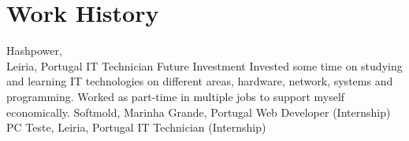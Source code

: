 \section[\faGears]{Work History}
    {Hashpower,\\Leiria, Portugal}
    {IT Technician}
    {}
    {}
    {Future Investment}
    {Invested some time on studying and learning IT technologies on different areas, hardware, network, systems and programming. Worked as part-time in multiple jobs to support myself economically.}
    {Softmold, Marinha Grande, Portugal}
    {Web Developer (Internship)}
    {}
    {PC Teste, Leiria, Portugal}
    {IT Technician (Internship)}
    {}
    
